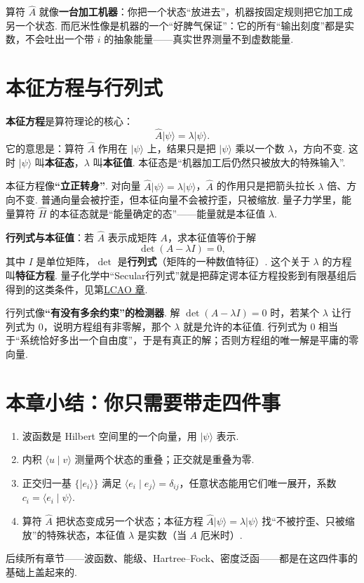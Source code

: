 \documentclass[UTF8,11pt,a4paper,openany]{ctexbook}
\newcommand{\ket}[1]{\lvert #1\rangle}\newcommand{\bra}[1]{\langle #1\rvert}
\newcommand{\braket}[2]{\langle #1\mid #2\rangle}\newcommand{\ii}{\mathrm i}
\newcommand{\term}[1]{\textbf{#1}}
\begin{document}
\begin{analogybox}
算符 $\hat A$ 就像\textbf{一台加工机器}：你把一个状态“放进去”，机器按固定规则把它加工成另一个状态. 而厄米性像是机器的一个“好脾气保证”：它的所有“输出刻度”都是实数，不会吐出一个带 $i$ 的抽象能量——真实世界测量不到虚数能量. 
\end{analogybox}

\section{本征方程与行列式}
\term{本征方程}是算符理论的核心：
\[
\hat A\ket\psi=\lambda\ket\psi.
\]
它的意思是：算符 $\hat A$ 作用在 $\ket\psi$ 上，结果只是把 $\ket\psi$ 乘以一个数 $\lambda$，方向不变. 这时 $\ket\psi$ 叫\term{本征态}，$\lambda$ 叫\term{本征值}. 本征态是“机器加工后仍然只被放大的特殊输入”. 

\begin{analogybox}
本征方程像\textbf{“立正转身”}. 对向量 $\hat A\ket\psi=\lambda\ket\psi$，$\hat A$ 的作用只是把箭头拉长 $\lambda$ 倍、方向不变. 普通向量会被拧歪，但本征向量不会被拧歪，只被缩放. 量子力学里，能量算符 $\hat H$ 的本征态就是“能量确定的态”——能量就是本征值 $\lambda$. 
\end{analogybox}

\textbf{行列式与本征值}：若 $\hat A$ 表示成矩阵 $A$，求本征值等价于解
\[
\det(A-\lambda I)=0,
\]
其中 $I$ 是单位矩阵，$\det$ 是\term{行列式}（矩阵的一种数值特征）. 这个关于 $\lambda$ 的方程叫\term{特征方程}. 量子化学中“Secular行列式”就是把薛定谔本征方程投影到有限基组后得到的这类条件，见第\hyperref[chap:lcao]{LCAO 章}. 

\begin{analogybox}
行列式像\textbf{“有没有多余约束”的检测器}. 解 $\det(A-\lambda I)=0$ 时，若某个 $\lambda$ 让行列式为 $0$，说明方程组有非零解，那个 $\lambda$ 就是允许的本征值. 行列式为 $0$ 相当于“系统恰好多出一个自由度”，于是有真正的解；否则方程组的唯一解是平庸的零向量. 
\end{analogybox}

\section{本章小结：你只需要带走四件事}
\begin{enumerate}
\item 波函数是 Hilbert 空间里的一个向量，用 $\ket\psi$ 表示. 
\item 内积 $\braket u v$ 测量两个状态的重叠；正交就是重叠为零. 
\item 正交归一基 $\{\ket{e_i}\}$ 满足 $\braket{e_i}{e_j}=\delta_{ij}$，任意状态能用它们唯一展开，系数 $c_i=\braket{e_i}{\psi}$. 
\item 算符 $\hat A$ 把状态变成另一个状态；本征方程 $\hat A\ket\psi=\lambda\ket\psi$ 找“不被拧歪、只被缩放”的特殊状态，本征值 $\lambda$ 是实数（当 $A$ 厄米时）. 
\end{enumerate}
后续所有章节——波函数、能级、Hartree--Fock、密度泛函——都是在这四件事的基础上盖起来的. 
\end{document}
